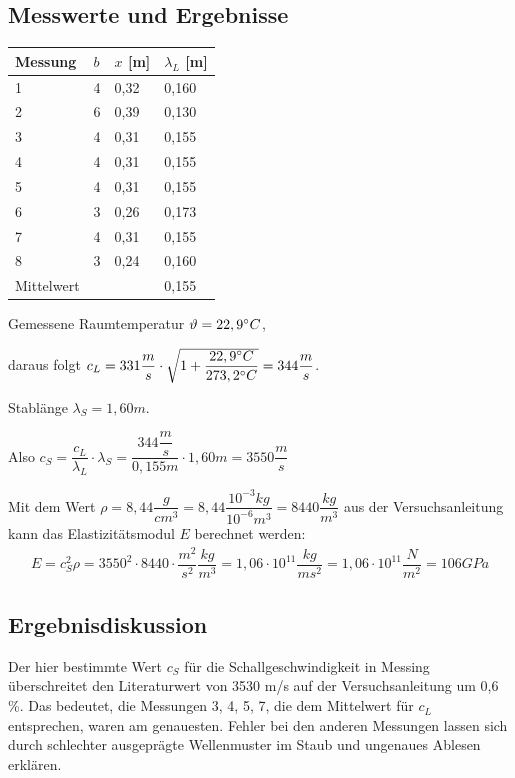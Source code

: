 \documentclass{scrartcl}
\begin{document}
\subsection{Messwerte und Ergebnisse}
\begin{table}[h]
\begin{tabular}{l|l|l|l}
Messung & $b$ & $x$ [m] & $\lambda_{L}$ [m]      \\
\hline
1       & 4            & 0,32    & 0,160 \\
2       & 6            & 0,39    & 0,130 \\
3       & 4            & 0,31    & 0,155 \\
4       & 4            & 0,31    & 0,155 \\
5       & 4            & 0,31    & 0,155 \\
6       & 3            & 0,26    & 0,173 \\
7       & 4            & 0,31    & 0,155 \\
8       & 3            & 0,24    & 0,160 \\
\hline
Mittelwert & & & 0,155
\end{tabular}
\end{table}
Gemessene Raumtemperatur $\vartheta = 22,9\degree C$,

daraus folgt $c_{L} = 331 \dfrac{m}{s} \cdot \sqrt{1+\dfrac{22,9\degree C}{273,2 \degree C}} = 344 \dfrac{m}{s}$.

Stablänge $\lambda_{S} = 1,60m$.

Also $c_{S} = \dfrac{c_{L}}{\lambda_{L}} \cdot \lambda_{S} = \dfrac{344\dfrac{m}{s}}{0,155m} \cdot 1,60m = 3550 \dfrac{m}{s}$

Mit dem Wert $\rho = 8,44 \dfrac{g}{cm^3} = 8,44 \dfrac{10^{-3} kg}{10^{-6} m^3} = 8440 \dfrac{kg}{m^3}$ aus der Versuchsanleitung \\ kann das Elastizitätsmodul $E$ berechnet werden:
\begin{align*}
E = c_{S}^2 \rho = 3550^2 \cdot 8440 \cdot \dfrac{m^2}{s^2} \dfrac{kg}{m^3} = 1,06 \cdot 10^{11} \dfrac{kg}{ms^2} = 1,06 \cdot 10^{11} \dfrac{N}{m^2} = 106 GPa
\end{align*}

\subsection{Ergebnisdiskussion}
Der hier bestimmte Wert $c_{S}$ für die Schallgeschwindigkeit in Messing überschreitet den Literaturwert  von 3530 m/s auf der Versuchsanleitung um 0,6 \%. Das bedeutet, die Messungen 3, 4, 5, 7, die dem Mittelwert für $c_{L}$ entsprechen, waren am genauesten. Fehler bei den anderen Messungen lassen sich durch schlechter ausgeprägte Wellenmuster im Staub und ungenaues Ablesen erklären. 
\end{document}
